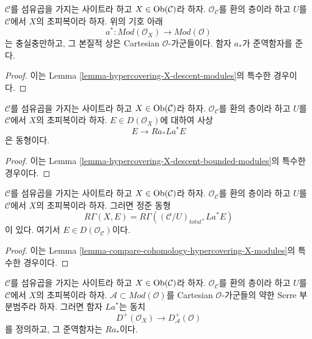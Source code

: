 \begin{lemma}
\label{lemma-hypercovering-X-simple-descent-modules}
$\mathcal{C}$를 섬유곱을 가지는 사이트라 하고
$X \in \mathop{\mathrm{Ob}}\nolimits(\mathcal{C})$라 하자. $\mathcal{O}_\mathcal{C}$를 환의
층이라 하고 $U$를 $\mathcal{C}$에서 $X$의 초피복이라 하자.
위의 기호 아래
$$
a^* : \textit{Mod}(\mathcal{O}_X) \to \textit{Mod}(\mathcal{O})
$$
는 충실충만하고, 그 본질적 상은 Cartesian $\mathcal{O}$-가군들이다.
함자 $a_*$가 준역함자를 준다.
\end{lemma}

\begin{proof}
이는 Lemma \ref{lemma-hypercovering-X-descent-modules}의 특수한 경우이다.
\end{proof}

\begin{lemma}
\label{lemma-hypercovering-X-simple-descent-bounded-modules}
$\mathcal{C}$를 섬유곱을 가지는 사이트라 하고
$X \in \mathop{\mathrm{Ob}}\nolimits(\mathcal{C})$라 하자. $\mathcal{O}_\mathcal{C}$를 환의
층이라 하고 $U$를 $\mathcal{C}$에서 $X$의 초피복이라 하자.
$E \in D(\mathcal{O}_X)$에 대하여 사상
$$
E \longrightarrow Ra_*La^*E
$$
은 동형이다.
\end{lemma}

\begin{proof}
이는 Lemma
\ref{lemma-hypercovering-X-descent-bounded-modules}의 특수한 경우이다.
\end{proof}

\begin{lemma}
\label{lemma-compare-cohomology-hypercovering-X-simple-modules}
$\mathcal{C}$를 섬유곱을 가지는 사이트라 하고
$X \in \mathop{\mathrm{Ob}}\nolimits(\mathcal{C})$라 하자. $\mathcal{O}_\mathcal{C}$를 환의
층이라 하고 $U$를 $\mathcal{C}$에서 $X$의 초피복이라 하자.
그러면 정준 동형
$$
R\Gamma(X, E) = R\Gamma((\mathcal{C}/U)_{total}, La^*E)
$$
이 있다. 여기서
$E \in D(\mathcal{O}_\mathcal{C})$이다.
\end{lemma}

\begin{proof}
이는 Lemma
\ref{lemma-compare-cohomology-hypercovering-X-modules}의 특수한 경우이다.
\end{proof}

\begin{lemma}
\label{lemma-hypercovering-X-simple-equivalence-bounded-modules}
$\mathcal{C}$를 섬유곱을 가지는 사이트라 하고
$X \in \mathop{\mathrm{Ob}}\nolimits(\mathcal{C})$라 하자. $\mathcal{O}_\mathcal{C}$를 환의
층이라 하고 $U$를 $\mathcal{C}$에서 $X$의 초피복이라 하자.
$\mathcal{A} \subset \textit{Mod}(\mathcal{O})$를 Cartesian
$\mathcal{O}$-가군들의 약한 Serre 부분범주라 하자. 그러면 함자
$La^*$는 동치
$$
D^+(\mathcal{O}_X) \longrightarrow D_\mathcal{A}^+(\mathcal{O})
$$
를 정의하고, 그 준역함자는 $Ra_*$이다.
\end{lemma}

